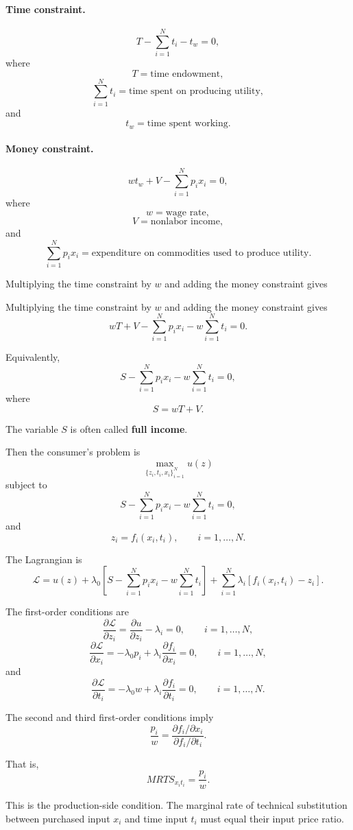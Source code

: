 \paragraph{Time constraint.}
\[
T-\sum_{i=1}^N t_i-t_w=0,
\]
where
\[
T
=
\text{time endowment},
\]
\[
\sum_{i=1}^N t_i
=
\text{time spent on producing utility},
\]
and
\[
t_w
=
\text{time spent working}.
\]

\paragraph{Money constraint.}
\[
wt_w+V-\sum_{i=1}^N p_ix_i=0,
\]
where
\[
w
=
\text{wage rate},
\]
\[
V
=
\text{nonlabor income},
\]
and
\[
\sum_{i=1}^N p_ix_i
=
\text{expenditure on commodities used to produce utility}.
\]

Multiplying the time constraint by \(w\) and adding the money constraint gives


Multiplying the time constraint by \(w\) and adding the money constraint gives
\[
wT+V-\sum_{i=1}^N p_i x_i-w\sum_{i=1}^N t_i=0.
\]

Equivalently,
\[
S-\sum_{i=1}^N p_i x_i-w\sum_{i=1}^N t_i=0,
\]
where
\[
S=wT+V.
\]

The variable \(S\) is often called \textbf{full income}.

Then the consumer's problem is
\[
\max_{\{z_i,t_i,x_i\}_{i=1}^N} u(z)
\]
subject to
\[
S-\sum_{i=1}^N p_i x_i-w\sum_{i=1}^N t_i=0,
\]
and
\[
z_i=f_i(x_i,t_i),
\qquad
i=1,\dots,N.
\]

The Lagrangian is
\[
\mathcal{L}
=
u(z)
+
\lambda_0
\left[
S-\sum_{i=1}^N p_i x_i-w\sum_{i=1}^N t_i
\right]
+
\sum_{i=1}^N
\lambda_i
\left[
f_i(x_i,t_i)-z_i
\right].
\]

The first-order conditions are
\[
\frac{\partial \mathcal{L}}{\partial z_i}
=
\frac{\partial u}{\partial z_i}
-
\lambda_i
=
0,
\qquad
i=1,\dots,N,
\]
\[
\frac{\partial \mathcal{L}}{\partial x_i}
=
-\lambda_0p_i
+
\lambda_i
\frac{\partial f_i}{\partial x_i}
=
0,
\qquad
i=1,\dots,N,
\]
and
\[
\frac{\partial \mathcal{L}}{\partial t_i}
=
-\lambda_0w
+
\lambda_i
\frac{\partial f_i}{\partial t_i}
=
0,
\qquad
i=1,\dots,N.
\]

The second and third first-order conditions imply
\[
\frac{p_i}{w}
=
\frac{
\partial f_i/\partial x_i
}{
\partial f_i/\partial t_i
}.
\]

That is,
\[
MRTS_{x_it_i}
=
\frac{p_i}{w}.
\]

This is the production-side condition. The marginal rate of technical substitution between purchased input \(x_i\) and time input \(t_i\) must equal their input price ratio.

